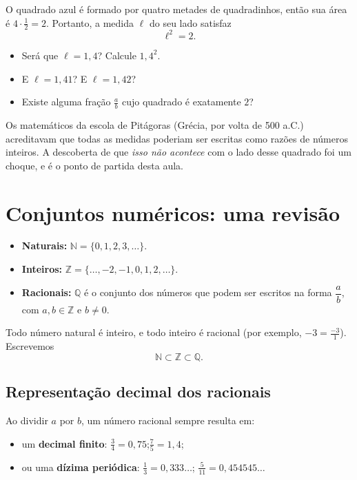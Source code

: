 \documentclass[11pt,a4paper]{article}
\begin{document}
O quadrado azul é formado por quatro metades de quadradinhos, então sua área
é $4 \cdot \frac{1}{2} = 2$. Portanto, a medida $\ell$ do seu lado satisfaz
\[
  \ell^2 = 2 .
\]

\begin{itemize}
  \item Será que $\ell = 1{,}4$? Calcule $1{,}4^2$.
  \item E $\ell = 1{,}41$? E $\ell = 1{,}42$?
  \item Existe alguma fração $\frac{a}{b}$ cujo quadrado é exatamente $2$?
\end{itemize}

Os matemáticos da escola de Pitágoras (Grécia, por volta de 500 a.C.)
acreditavam que todas as medidas poderiam ser escritas como razões de números
inteiros. A descoberta de que \emph{isso não acontece} com o lado desse quadrado
foi um choque, e é o ponto de partida desta aula.

\section{Conjuntos numéricos: uma revisão}

\begin{definicao}
\begin{itemize}[nosep]
  \item \textbf{Naturais:} $\mathbb{N} = \{0, 1, 2, 3, \dots\}$.
  \item \textbf{Inteiros:} $\mathbb{Z} = \{\dots, -2, -1, 0, 1, 2, \dots\}$.
  \item \textbf{Racionais:} $\mathbb{Q}$ é o conjunto dos números que podem ser
        escritos na forma $\dfrac{a}{b}$, com $a, b \in \mathbb{Z}$ e $b \neq 0$.
\end{itemize}
\end{definicao}

Todo número natural é inteiro, e todo inteiro é racional (por exemplo,
$-3 = \frac{-3}{1}$). Escrevemos
\[
  \mathbb{N} \subset \mathbb{Z} \subset \mathbb{Q}.
\]

\subsection*{Representação decimal dos racionais}

Ao dividir $a$ por $b$, um número racional sempre resulta em:
\begin{itemize}[nosep]
  \item um \textbf{decimal finito}: $\frac{3}{4} = 0{,}75$;\quad $\frac{7}{5} = 1{,}4$;
  \item ou uma \textbf{dízima periódica}: $\frac{1}{3} = 0{,}333\ldots$;\quad
        $\frac{5}{11} = 0{,}454545\ldots$
\end{itemize}
\end{document}
